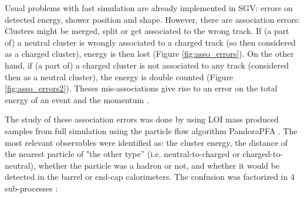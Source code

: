 Usual problems with fast simulation are already implemented in SGV: errors on detected energy, shower position and shape. However, there are association errors: Clusters might be merged, split or get associated to the wrong track. If (a part of) a neutral cluster is wrongly associated to a charged track (so then considered as a charged cluster), energy is then lost (Figure \ref{fig:asso_errors}). On the other hand, if (a part of) a charged cluster is not associated to any track (considered then as a neutral cluster), the energy is double counted (Figure \ref{fig:asso_errors2}). Theses mis-associations give rise to an error on the total energy of an event and the momentum \cite{Madalina}.


\noindent
The study of these association errors was done by using LOI mass produced samples from full simulation using the particle flow algorithm PandoraPFA  \cite{Thomson}. The most relevant observables were identified as: the cluster energy, the distance of the nearest particle of "the other type'' (i.e. neutral-to-charged or charged-to-neutral), whether the particle was a hadron or not, and whether it would be detected in the barrel or end-cap calorimeters.
The confusion was factorized in 4 sub-processes \cite{Berggren}:

